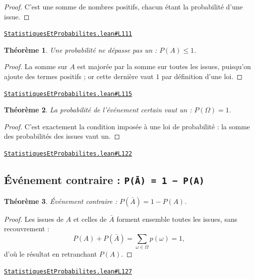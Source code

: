 \documentclass[11pt,a4paper]{article}
\theoremstyle{definition}
\theoremstyle{plain}
\newtheorem{theoreme}{Théorème}
\newcommand{\source}[2]{\par\smallskip\noindent\hfill{\footnotesize\href{#1}{\texttt{#2}}}\par\smallskip}
\begin{document}
\begin{proof}
C'est une somme de nombres positifs, chacun étant la probabilité d'une issue.
\end{proof}
\source{https://github.com/Commutator-IO/learn-lean/blob/main/courses/01-college/06-statistiques-et-probabilites/StatistiquesEtProbabilites.lean\#L111}{StatistiquesEtProbabilites.lean\#L111}

\begin{theoreme}
Une probabilité ne dépasse pas un : $P(A) \le 1$.
\end{theoreme}

\begin{proof}
La somme sur $A$ est majorée par la somme sur toutes les issues, puisqu'on ajoute des
termes positifs ; or cette dernière vaut $1$ par définition d'une loi.
\end{proof}
\source{https://github.com/Commutator-IO/learn-lean/blob/main/courses/01-college/06-statistiques-et-probabilites/StatistiquesEtProbabilites.lean\#L115}{StatistiquesEtProbabilites.lean\#L115}

\begin{theoreme}
La probabilité de l'événement certain vaut un : $P(\Omega) = 1$.
\end{theoreme}

\begin{proof}
C'est exactement la condition imposée à une loi de probabilité : la somme des
probabilités des issues vaut un.
\end{proof}
\source{https://github.com/Commutator-IO/learn-lean/blob/main/courses/01-college/06-statistiques-et-probabilites/StatistiquesEtProbabilites.lean\#L122}{StatistiquesEtProbabilites.lean\#L122}

\subsection{Événement contraire : \texttt{P(Ā) = 1 − P(A)}}

\begin{theoreme}
Événement contraire : $P(\bar{A}) = 1 - P(A)$.
\end{theoreme}

\begin{proof}
Les issues de $A$ et celles de $\bar{A}$ forment ensemble toutes les issues, sans
recouvrement :
\[ P(A) + P(\bar{A}) = \sum_{\omega \in \Omega} p(\omega) = 1 , \]
d'où le résultat en retranchant $P(A)$.
\end{proof}
\source{https://github.com/Commutator-IO/learn-lean/blob/main/courses/01-college/06-statistiques-et-probabilites/StatistiquesEtProbabilites.lean\#L127}{StatistiquesEtProbabilites.lean\#L127}
\end{document}
